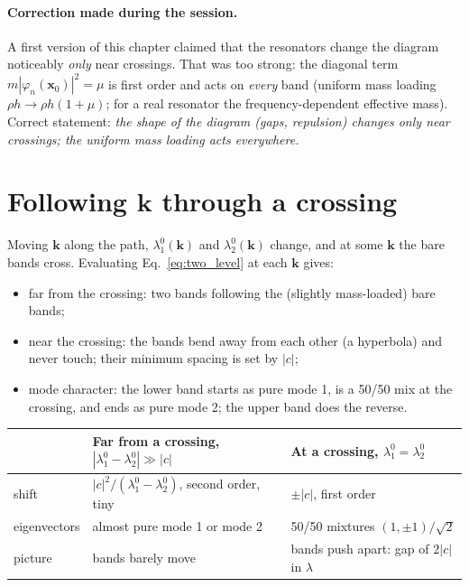\paragraph{Correction made during the session.}
A first version of this chapter claimed that the resonators change the
diagram noticeably \emph{only} near crossings. That was too strong: the
diagonal term $m|\varphi_n(\mathbf{x}_0)|^2 = \mu$ is first order and acts on
\emph{every} band (uniform mass loading $\rho h \to \rho h(1+\mu)$; for a real
resonator the frequency-dependent effective mass). Correct statement:
\emph{the shape of the diagram (gaps, repulsion) changes only near crossings;
the uniform mass loading acts everywhere.}

\section{Following $\mathbf{k}$ through a crossing}

Moving $\mathbf{k}$ along the path, $\lambda_1^0(\mathbf{k})$ and
$\lambda_2^0(\mathbf{k})$ change, and at some $\mathbf{k}$ the bare bands
cross. Evaluating Eq.~\eqref{eq:two_level} at each $\mathbf{k}$ gives:
\begin{itemize}
  \item far from the crossing: two bands following the (slightly mass-loaded)
        bare bands;
  \item near the crossing: the bands bend away from each other (a hyperbola)
        and never touch; their minimum spacing is set by $|c|$;
  \item mode character: the lower band starts as pure mode 1, is a 50/50 mix
        at the crossing, and ends as pure mode 2; the upper band does the
        reverse.
\end{itemize}

\begin{center}
\begin{tabular}{|l|p{}|p{}|}
\hline
 & Far from a crossing, $|\lambda_1^0 - \lambda_2^0| \gg |c|$ & At a crossing, $\lambda_1^0 = \lambda_2^0$ \\
\hline
shift & $|c|^2/(\lambda_1^0 - \lambda_2^0)$, second order, tiny & $\pm|c|$, first order \\
eigenvectors & almost pure mode 1 or mode 2 & 50/50 mixtures $(1, \pm 1)/\sqrt{2}$ \\
picture & bands barely move & bands push apart: gap of $2|c|$ in $\lambda$ \\
\hline
\end{tabular}
\end{center}

